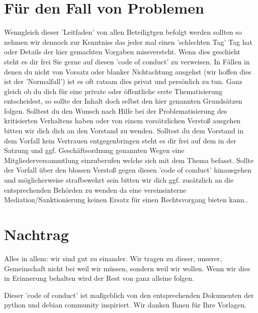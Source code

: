 \documentclass[10pt,a4paper]{article}
\begin{document}
\section*{Für den Fall von Problemen}
Wenngleich dieser 'Leitfaden' von allen Beteiligtgen befolgt werden sollten so
nehmen wir dennoch zur Kenntniss das jeder mal einen 'schlechten Tag' Tag hat
oder Details der hier gemachten Vorgaben missversteht. Wenn dies geschieht
steht es dir frei Sie gerne auf diesen 'code of conduct' zu verweisen. In
Fällen in denen du nicht von Vorsatz oder blanker Nichtachtung ausgehst (wir
hoffen dies ist der 'Normalfall') ist es oft ratsam dies privat und persönlich
zu tun. Ganz gleich ob du dich für eine private oder öffentliche erste
Thematisierung entscheidest, so sollte der Inhalt doch selbst den hier
genannten Grundsätzen folgen.
Solltest du den Wunsch nach Hilfe bei der Problematisierung des kritisierten
Verhaltens haben oder von einem vorsätzlichen Verstoß ausgehen bitten wir dich
dich an den Vorstand zu wenden.  Solltest du dem Vorstand in dem Vorfall kein
Vertrauen entgegenbringen steht es dir frei auf dem in der Satzung und ggf.
Geschäftsordnung genannten Wegen eine Mitgliederversammtlung einzuberufen
welche sich mit dem Thema befasst.
Sollte der Vorfall über den blossen Verstoß gegen diesen 'code of conduct'
hinausgehen und möglicherweise strafbewehrt sein bitten wir dich ggf.
zusätzlich an die entsprechenden Behörden zu wenden da eine vereinsinterne
Mediation/Sanktionierung keinen Ersatz für einen Rechtsvorgang bieten kann..

\section*{Nachtrag}
Alles in allem: wir sind gut zu einander. Wir tragen zu dieser, unserer,
Gemeinschaft nicht bei weil wir müssen, sondern weil wir wollen. Wenn wir dies
in Erinnerung behalten wird der Rest von ganz alleine folgen.

Dieser 'code of conduct' ist maßgeblich von den entsprechenden Dokumenten der
python und debian community inspiriert. Wir danken Ihnen für Ihre Vorlagen.
\end{document}
